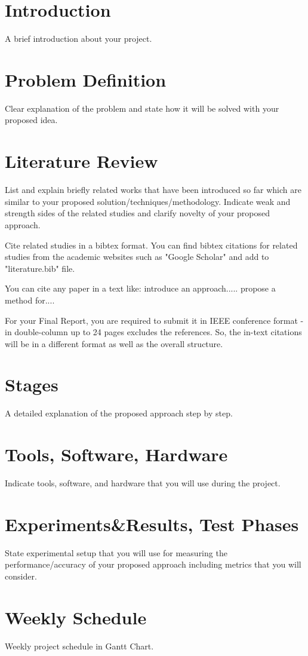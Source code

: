 \documentclass[14pt]{article}
\begin{document}
\section{Introduction}
A brief introduction about your project.

\section{Problem Definition}
Clear explanation of the problem and state how it will be solved with your proposed idea. 

\section{Literature Review}
List and explain briefly related works that have been introduced so far which are similar to your proposed solution/techniques/methodology. Indicate weak and strength sides of the related studies and clarify novelty of your proposed approach.

Cite related studies in a bibtex format. You can find bibtex citations for related studies from the academic websites such as "Google Scholar" and add to "literature.bib" file.   

You can cite any paper in a text like: \cite{corke2011robotics} introduce an approach.....
\cite{mahonyKC12} propose a method for....

For your Final Report, you are required to submit it in IEEE conference format -in double-column up to 24 pages excludes the references. So, the in-text citations  will be in a different format as well as the overall structure.

\section{Stages}
A detailed explanation of the proposed approach step by step.
\section{Tools, Software, Hardware}
Indicate tools, software, and hardware that you will use during the project.
\section{Experiments\&Results, Test Phases}
State experimental setup that you will use for measuring the performance/accuracy of your proposed approach including metrics that you will consider.

\section{Weekly Schedule}
Weekly project schedule in Gantt Chart.



\end{document}
